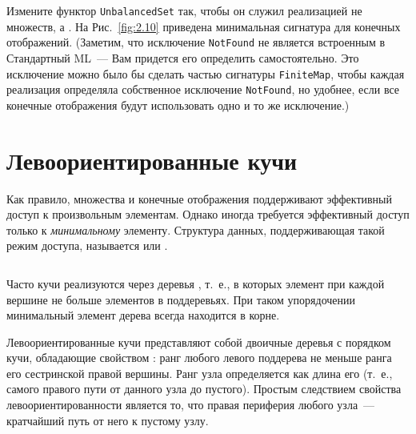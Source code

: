 \begin{frame}
\begin{exercise}\label{ex:2.6}
  Измените функтор \texttt{UnbalancedSet} так, чтобы он служил
  реализацией не множеств, а . На
  Рис.~\ref{fig:2.10} приведена минимальная сигнатура для конечных
  отображений. (Заметим, что исключение \texttt{NotFound} не
  является встроенным в Стандартный ML~--- Вам придется его определить
  самостоятельно. Это исключение можно было бы сделать частью
  сигнатуры \texttt{FiniteMap},  чтобы каждая реализация
  определяла собственное исключение \texttt{NotFound}, но удобнее,
  если все конечные отображения будут использовать одно и то же
  исключение.)
\end{exercise}

\end{frame}

\section{Левоориентированные кучи}

\begin{frame}[fragile]{}
Как правило, множества и конечные отображения поддерживают эффективный
доступ к произвольным элементам. Однако иногда требуется эффективный
доступ только к \emph{минимальному} элементу.  Структура данных,
поддерживающая такой режим доступа, называется  или .

\inputminted[firstline=3, lastline=11] {haskell}{code/Heap.hs}
\end{frame}

\begin{frame}[fragile]{}
Часто кучи реализуются через деревья , т.~е., в которых элемент при каждой вершине не
больше элементов в поддеревьях. При таком упорядочении минимальный
элемент дерева всегда находится в корне.\vspace{1cm}

Левоориентированные кучи \cite{Crane1972, Knuth1973a} представляют
собой двоичные деревья с порядком кучи, обладающие свойством
: ранг любого левого поддерева
не меньше ранга его сестринской правой вершины.  Ранг узла
определяется как длина его 
(т.~е., самого правого пути от данного узла до пустого).  Простым
следствием свойства левоориентированности является то, что правая
периферия любого узла~--- кратчайший путь от него к пустому узлу.
\end{frame}

